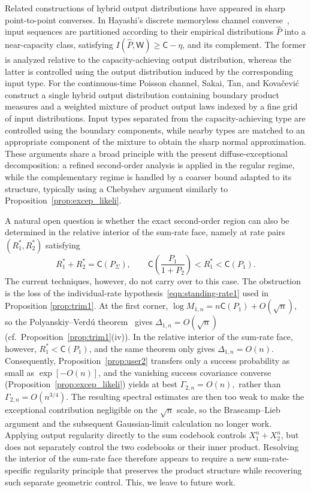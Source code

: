 \documentclass[11pt,onecolumn]{IEEEtran}
\newcommand{\rvC}{\mathsf{C}}
\newcommand{\rvW}{\mathsf{W}}
\newcommand{\hatP}{\hat{P}}
\begin{document}
Related  constructions of hybrid output distributions have appeared in sharp point-to-point converses. In Hayashi's discrete memoryless channel converse~\cite{Hayashi09}, input sequences are partitioned according to their empirical distributions $\hatP$ into a near-capacity class, satisfying $I(\hatP,\rvW)\ge \rvC-\eta$, and its complement. The former is analyzed relative to the capacity-achieving  output distribution, whereas the latter is controlled using the output distribution induced by the corresponding input type. For the continuous-time Poisson channel, Sakai, Tan, and Kova\v{c}evi\'c~\cite{STK2020} construct a single hybrid  output distribution containing boundary product measures and a weighted mixture of product output laws indexed by a fine grid of input distributions. Input types separated from the capacity-achieving type are controlled using the boundary components, while nearby types are matched to an appropriate component of the mixture to obtain the sharp normal approximation. These arguments share a broad principle with the present diffuse-exceptional decomposition: a refined second-order analysis is applied in the regular regime, while the complementary regime is handled by a coarser bound adapted to its structure, typically using a Chebyshev argument similarly to Proposition~\ref{prop:excep_likeli}.

A natural open question is whether the exact second-order region can also be determined in the relative interior of the sum-rate face, namely at rate pairs $(R_1^*, R_2^*)$ satisfying
\begin{equation}
R_1^*+R_2^*=\rvC(P_\Sigma),
\qquad \rvC\left(\frac{P_1}{1+P_2}\right)<R_1^*<\rvC(P_1).
\end{equation} 
The current techniques, however, do not carry over to this case. The obstruction is   the loss of the individual-rate  hypothesis~\eqref{eqn:standing-rate1} used in Proposition \ref{prop:trim1}. At the first corner, $\log M_{1,n} = n\rvC(P_1) + O(\sqrt{n})$, so the Polyanskiy--Verd\'u theorem~\cite{PolVerdu14}   gives $\Delta_{1,n}=O(\sqrt{n})$ (cf.\ Proposition~\ref{prop:trim1}(iv)). In the relative interior of the sum-rate face, however, $R_1^*< \rvC(P_1)$, and the same theorem only gives $\Delta_{1,n}=O(n)$. Consequently, Proposition~\ref{prop:user2} transfers only a success probability as small as $\exp[-O(n)]$, and the vanishing success covariance converse (Proposition~\ref{prop:excep_likeli}) yields at best $\Gamma_{2,n}=O(n),$ rather than $\Gamma_{2,n}=O(n^{3/4})$. The resulting spectral estimates are then too weak to make the exceptional contribution negligible on the $\sqrt n$ scale, so the Brascamp--Lieb argument and the subsequent Gaussian-limit calculation no longer work. Applying output regularity directly to the sum codebook controls $X_1^n+X_2^n$, but does not separately control the two codebooks or their inner product. Resolving the interior of the sum-rate face therefore appears to require a new sum-rate-specific regularity principle that preserves the product structure while recovering such separate geometric control. This, we leave to future work.
\end{document}
